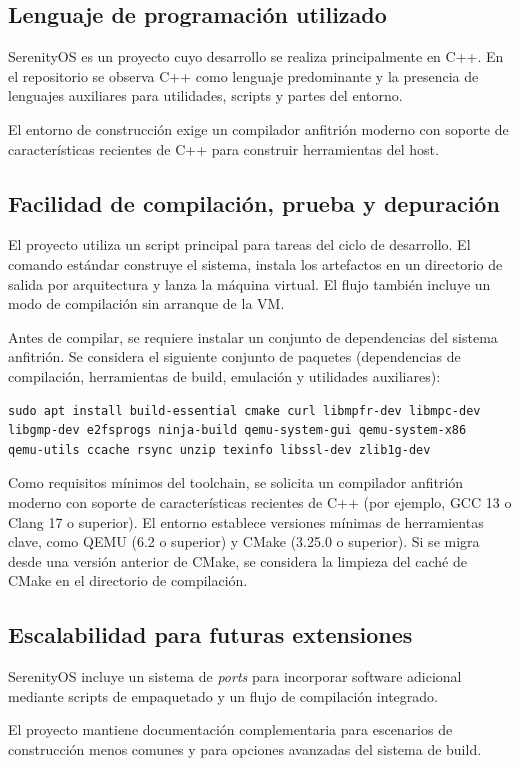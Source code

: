 \subsection{Lenguaje de programación utilizado}
SerenityOS es un proyecto cuyo desarrollo se realiza principalmente en C++. En el repositorio se observa C++ como lenguaje predominante y la presencia de lenguajes auxiliares para utilidades, scripts y partes del entorno.

El entorno de construcción exige un compilador anfitrión moderno con soporte de características recientes de C++ para construir herramientas del host.

\subsection{Facilidad de compilación, prueba y depuración}
El proyecto utiliza un script principal para tareas del ciclo de desarrollo. El comando estándar construye el sistema, instala los artefactos en un directorio de salida por arquitectura y lanza la máquina virtual. El flujo también incluye un modo de compilación sin arranque de la VM.

Antes de compilar, se requiere instalar un conjunto de dependencias del sistema anfitrión. Se considera el siguiente conjunto de paquetes (dependencias de compilación, herramientas de build, emulación y utilidades auxiliares):
\begin{verbatim}
sudo apt install build-essential cmake curl libmpfr-dev libmpc-dev
libgmp-dev e2fsprogs ninja-build qemu-system-gui qemu-system-x86
qemu-utils ccache rsync unzip texinfo libssl-dev zlib1g-dev
\end{verbatim}

Como requisitos mínimos del toolchain, se solicita un compilador anfitrión moderno con soporte de características recientes de C++ (por ejemplo, GCC 13 o Clang 17 o superior). El entorno establece versiones mínimas de herramientas clave, como QEMU (6.2 o superior) y CMake (3.25.0 o superior). Si se migra desde una versión anterior de CMake, se considera la limpieza del caché de CMake en el directorio de compilación.

\subsection{Escalabilidad para futuras extensiones}
SerenityOS incluye un sistema de \emph{ports} para incorporar software adicional mediante scripts de empaquetado y un flujo de compilación integrado.

El proyecto mantiene documentación complementaria para escenarios de construcción menos comunes y para opciones avanzadas del sistema de build.